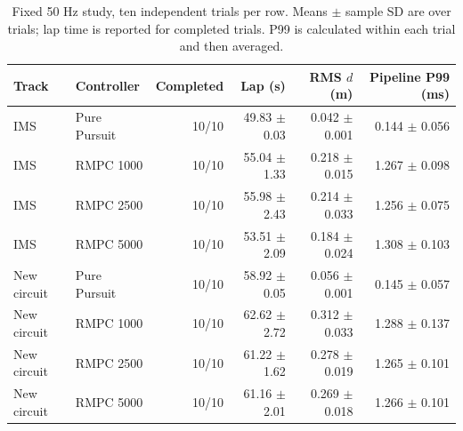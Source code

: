 \begin{table}[t]
\centering\small
\caption{Fixed 50 Hz study, ten independent trials per row. Means $\pm$ sample SD are over trials; lap time is reported for completed trials. P99 is calculated within each trial and then averaged.}
\label{tab:controlled}
\begin{tabular}{llrrrr}
\toprule
Track & Controller & Completed & Lap (s) & RMS $d$ (m) & Pipeline P99 (ms)\\
\midrule
IMS & Pure Pursuit & 10/10 & 49.83 $\pm$ 0.03 & 0.042 $\pm$ 0.001 & 0.144 $\pm$ 0.056 \\
IMS & RMPC 1000 & 10/10 & 55.04 $\pm$ 1.33 & 0.218 $\pm$ 0.015 & 1.267 $\pm$ 0.098 \\
IMS & RMPC 2500 & 10/10 & 55.98 $\pm$ 2.43 & 0.214 $\pm$ 0.033 & 1.256 $\pm$ 0.075 \\
IMS & RMPC 5000 & 10/10 & 53.51 $\pm$ 2.09 & 0.184 $\pm$ 0.024 & 1.308 $\pm$ 0.103 \\
New circuit & Pure Pursuit & 10/10 & 58.92 $\pm$ 0.05 & 0.056 $\pm$ 0.001 & 0.145 $\pm$ 0.057 \\
New circuit & RMPC 1000 & 10/10 & 62.62 $\pm$ 2.72 & 0.312 $\pm$ 0.033 & 1.288 $\pm$ 0.137 \\
New circuit & RMPC 2500 & 10/10 & 61.22 $\pm$ 1.62 & 0.278 $\pm$ 0.019 & 1.265 $\pm$ 0.101 \\
New circuit & RMPC 5000 & 10/10 & 61.16 $\pm$ 2.01 & 0.269 $\pm$ 0.018 & 1.266 $\pm$ 0.101 \\
\bottomrule
\end{tabular}
\end{table}
